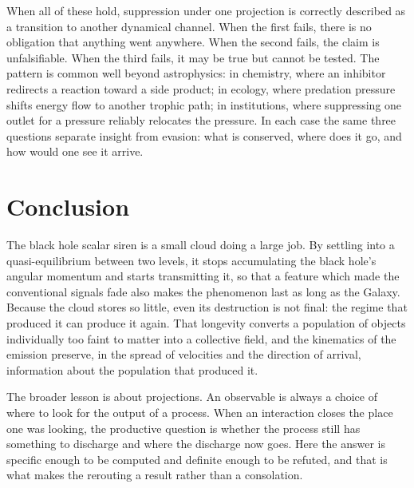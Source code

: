 \documentclass[11pt]{article}
\begin{document}
When all of these hold, suppression under one projection is correctly described as a transition to another dynamical channel. When the first fails, there is no obligation that anything went anywhere. When the second fails, the claim is unfalsifiable. When the third fails, it may be true but cannot be tested. The pattern is common well beyond astrophysics: in chemistry, where an inhibitor redirects a reaction toward a side product; in ecology, where predation pressure shifts energy flow to another trophic path; in institutions, where suppressing one outlet for a pressure reliably relocates the pressure. In each case the same three questions separate insight from evasion: what is conserved, where does it go, and how would one see it arrive.

\section{Conclusion}

The black hole scalar siren is a small cloud doing a large job. By settling into a quasi-equilibrium between two levels, it stops accumulating the black hole's angular momentum and starts transmitting it, so that a feature which made the conventional signals fade also makes the phenomenon last as long as the Galaxy. Because the cloud stores so little, even its destruction is not final: the regime that produced it can produce it again. That longevity converts a population of objects individually too faint to matter into a collective field, and the kinematics of the emission preserve, in the spread of velocities and the direction of arrival, information about the population that produced it.

The broader lesson is about projections. An observable is always a choice of where to look for the output of a process. When an interaction closes the place one was looking, the productive question is whether the process still has something to discharge and where the discharge now goes. Here the answer is specific enough to be computed and definite enough to be refuted, and that is what makes the rerouting a result rather than a consolation.
\end{document}
